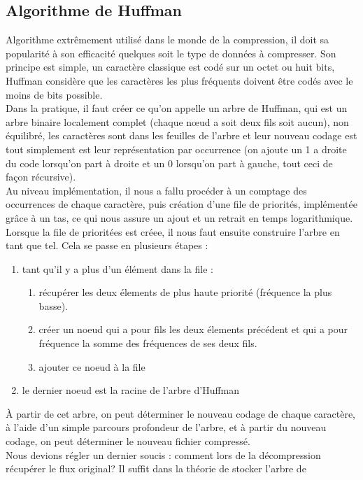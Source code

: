 \documentclass[a4paper,12pt]{article}
\begin{document}
	\subsection{Algorithme de Huffman}
Algorithme extrêmement utilisé dans le monde de la compression, il doit sa
popularité à son efficacité quelques soit le type de données à compresser. Son
principe est simple, un caractère classique est codé sur un octet ou huit bits,
Huffman considère que les caractères les plus fréquents doivent être codés avec
le moins de bits possible.\\
Dans la pratique, il faut créer ce qu'on appelle un arbre de Huffman, qui est un
arbre binaire localement complet (chaque nœud a soit deux fils soit aucun),
non équilibré, les caractères sont dans les feuilles de l'arbre et leur nouveau
codage est tout simplement est leur représentation par occurrence (on ajoute un 1
a droite du code lorsqu'on part à droite et un 0 lorsqu'on part à gauche, tout
ceci de façon récursive).\\
Au niveau implémentation, il nous a fallu procéder à un comptage des occurrences
de chaque caractère, puis création d'une file de priorités, implémentée grâce à
un tas, ce qui nous assure un ajout et un retrait en temps logarithmique.
Lorsque la file de prioritées est créee, il nous faut ensuite construire l'arbre
en tant que tel. Cela se passe en plusieurs étapes :
\begin{enumerate}
\item tant qu'il y a plus d'un élément dans la file :
\begin{enumerate}
\item récupérer les deux élements de plus haute priorité (fréquence la
plus basse).
\item créer un noeud qui a pour fils les deux élements précédent et qui
a pour fréquence la somme des fr\'equences de ses deux fils.
\item ajouter ce noeud à la file
\end{enumerate}
\item le dernier noeud est la racine de l'arbre d'Huffman
\end{enumerate}
À partir de cet arbre, on peut déterminer le nouveau codage de chaque caractère,
à l'aide d'un simple parcours profondeur de l'arbre, et à partir du nouveau
codage, on peut déterminer le nouveau fichier compressé.\\
Nous devions régler un dernier soucis : comment lors de la décompression
récupérer le flux original? Il suffit dans la théorie de stocker l'arbre de
\end{document}

